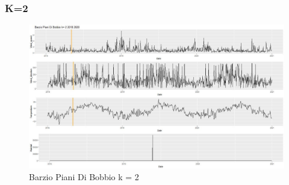 \documentclass{article}
\begin{document}
\subsubsection{K=2}
\begin{figure}[H]
  \centering 
  \includegraphics[scale = 0.3]{Picture/2/Barzio Piani Di Bobbio k= 2 2018 2020 .jpeg}
  \caption{Barzio Piani Di Bobbio k = 2}
  \centering
\end{figure}
\end{document}
